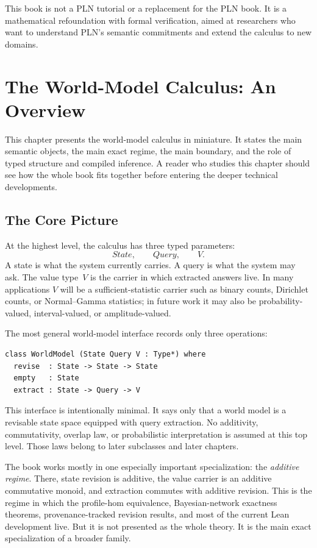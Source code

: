 \documentclass[11pt,openany]{report}
\begin{document}
\noindent
This book is not a PLN tutorial or a replacement for the PLN
book.  It is a mathematical refoundation with formal
verification, aimed at researchers who want to understand PLN's
semantic commitments and extend the calculus to new domains.


\chapter{The World-Model Calculus: An Overview}
\label{chap:overview}

This chapter presents the world-model calculus in miniature.
It states the main semantic objects, the main exact regime, the
main boundary, and the role of typed structure and compiled
inference.  A reader who studies this chapter should see how the
whole book fits together before entering the deeper technical
developments.

\section{The Core Picture}
\label{sec:overview-core-picture}

At the highest level, the calculus has three typed parameters:
\[
  \textit{State}, \qquad \textit{Query}, \qquad V.
\]
A state is what the system currently carries.  A query is what the system may
ask.  The value type~$V$ is the carrier in which extracted answers live.  In
many applications $V$ will be a sufficient-statistic carrier such as binary
counts, Dirichlet counts, or Normal--Gamma statistics; in future work it may
also be probability-valued, interval-valued, or amplitude-valued.

The most general world-model interface records only three operations:

\begin{lstlisting}[language={}]
class WorldModel (State Query V : Type*) where
  revise  : State -> State -> State
  empty   : State
  extract : State -> Query -> V
\end{lstlisting}

This interface is intentionally minimal.  It says only that a world model is a
revisable state space equipped with query extraction.  No additivity,
commutativity, overlap law, or probabilistic interpretation is assumed at this
top level.  Those laws belong to later subclasses and later chapters.

The book works mostly in one especially important specialization: the
\emph{additive regime}.  There, state revision is additive, the value carrier is
an additive commutative monoid, and extraction commutes with additive
revision.  This is the regime in which the profile-hom equivalence,
Bayesian-network exactness theorems, provenance-tracked revision results, and
most of the current Lean development live.  But it is not presented as the
whole theory.  It is the main exact specialization of a broader family.
\end{document}
